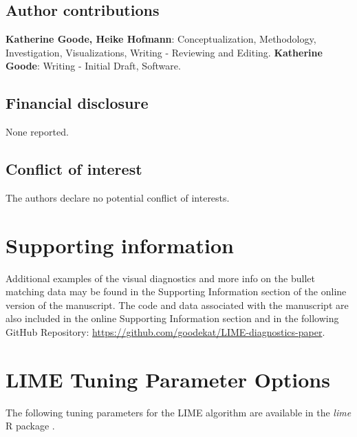 \documentclass[AMS,STIX2COL]{WileyNJD-v2}\usepackage[]{graphicx}\usepackage[]{color}
\begin{document}
\subsection*{Author contributions}

{\bf Katherine Goode, Heike Hofmann}: Conceptualization, Methodology, Investigation, Visualizations, Writing - Reviewing and Editing. {\bf Katherine Goode}: Writing - Initial Draft, Software.

\subsection*{Financial disclosure}

None reported.

\subsection*{Conflict of interest}

The authors declare no potential conflict of interests.

\section*{Supporting information}

Additional examples of the visual diagnostics and more info on the bullet matching data may be found in the Supporting Information section of the online version of the manuscript. The code  and  data associated with the manuscript are also included in the online Supporting Information section and  in the following GitHub Repository: \href{https://github.com/goodekat/LIME-diagnostics-paper}{https://github.com/goodekat/LIME-diagnostics-paper}.



\newpage

\appendix

\section{LIME Tuning Parameter Options} \label{lime-details}

The following tuning parameters for the LIME algorithm are available in the \emph{lime} R package \citep{pedersen:2020}.
\end{document}
